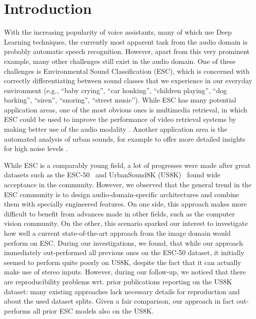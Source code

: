 \documentclass[a4paper,conference]{IEEEtran}
\begin{document}
\IEEEpeerreviewmaketitle



\section{Introduction} \label{sec:intro}
With the increasing popularity of voice assistants, many of which use Deep Learning techniques, the currently most apparent task from the audio domain is probably automatic speech recognition.
However, apart from this very prominent example, many other challenges still exist in the audio domain.
One of these challenges is Environmental Sound Classification (ESC), which is concerned with correctly differentiating between sound classes that we experience in our everyday environment (e.g., ``baby crying'', ``car honking'', ``children playing'', ``dog barking'', ``siren'', ``snoring'', ``street music'').
While ESC has many potential application areas, one of the most obvious ones is multimedia retrieval, in which ESC could be used to improve the performance of video retrieval systems by making better use of the audio modality \cite{jin2016video}.
Another application area is the automated analysis of urban sounds, for example to offer more detailed insights for high noise levels \cite{raimbault2005urban}.

While ESC is a comparably young field, a lot of progresses were made after great datasets such as the ESC-50~\cite{piczak2015esc} and \mbox{UrbanSound8K} (US8K)~\cite{salamon2014us8k} found wide acceptance in the community.
However, we observed that the general trend in the ESC community is to design audio-domain-specific architectures and combine them with specially engineered features.
On one side, this approach makes more difficult to benefit from advances made in other fields, such as the computer vision community.
On the other, this scenario sparked our interest to investigate how well a current \mbox{state-of-the-art} approach from the image domain would perform on ESC.
During our investigations, we found, that while our approach immediately out-performed all previous ones on the ESC-50 dataset, it initially seemed to perform quite poorly on US8K, despite the fact that it can actually make use of stereo inputs.
However, during our follow-up, we noticed that there are reproducibility problems wrt. prior publications reporting on the US8K dataset: many existing approaches lack necessary details for reproduction and about the used dataset splits. 
Given a fair comparison, our approach in fact out-performs all prior ESC models also on the US8K.
\end{document}

